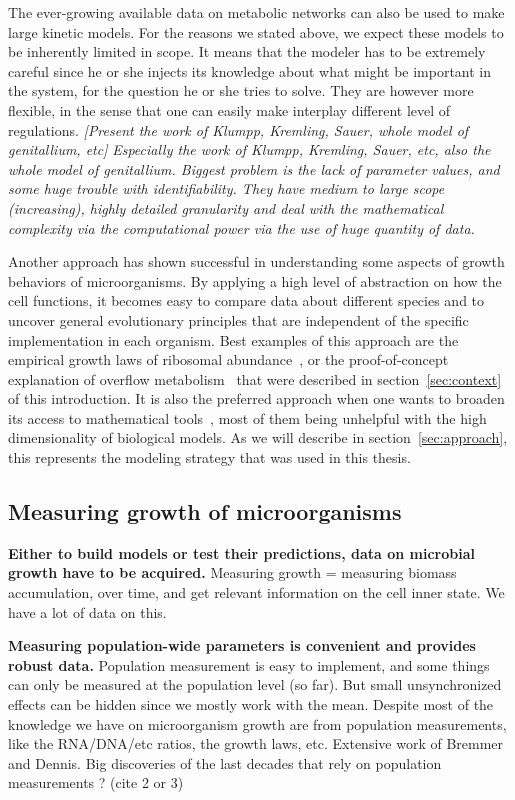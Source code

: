 The ever-growing available data on metabolic networks can also be used to make large kinetic models.
For the reasons we stated above, we expect these models to be inherently limited in scope.
It means that the modeler has to be extremely careful since he or she injects its knowledge about what might be important in the system, for the question he or she tries to solve.
They are however more flexible, in the sense that one can easily make interplay different level of regulations.
\textit{[Present the work of Klumpp, Kremling, Sauer, whole model of genitallium, etc]
}\textit{Especially the work of Klumpp, Kremling, Sauer, etc, also the whole model of genitallium.
Biggest problem is the lack of parameter values, and some huge trouble with identifiability.
They have medium to large scope (increasing), highly detailed granularity and deal with the mathematical complexity via the computational power via the use of huge quantity of data.}

Another approach has shown successful in understanding some aspects of growth behaviors of microorganisms.
By applying a high level of abstraction on how the cell functions, it becomes easy to compare data about different species and to uncover general evolutionary principles that are independent of the specific implementation in each organism.
Best examples of this approach are the empirical growth laws of ribosomal abundance~\cite{scott_bacterial_2011,scott_interdependence_2010,scott_emergence_2014}, or the proof-of-concept explanation of overflow metabolism~\cite{molenaar_shifts_2009} that were described in section~\ref{sec:context} of this introduction.
It is also the preferred approach when one wants to broaden its access to mathematical tools~\cite{vandenberg_optimal_1998}, most of them being unhelpful with the high dimensionality of biological models.
As we will describe in section~\ref{sec:approach}, this represents the modeling strategy that was used in this thesis.

\subsection{Measuring growth of microorganisms}

\textbf{Either to build models or test their predictions, data on microbial growth have to be acquired.}
Measuring growth = measuring biomass accumulation, over time, and get relevant information on the cell inner state.
We have a lot of data on this.

\textbf{Measuring population-wide parameters is convenient and provides robust data.}
Population measurement is easy to implement, and some things can only be measured at the population level (so far).
But small unsynchronized effects can be hidden since we mostly work with the mean.
Despite most of the knowledge we have on microorganism growth are from population measurements, like the RNA/DNA/etc ratios, the growth laws, etc.
Extensive work of Bremmer and Dennis.
Big discoveries of the last decades that rely on population measurements ? (cite 2 or 3)

